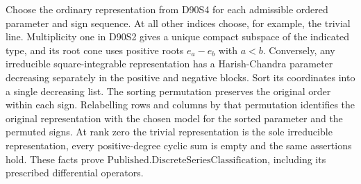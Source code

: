 Choose the ordinary representation from D90S4 for each admissible
ordered parameter and sign sequence. At all other indices choose,
for example, the trivial line. Multiplicity one in D90S2 gives a
unique compact subspace of the indicated type, and its root cone
uses positive roots $e_a-e_b$ with $a<b$. Conversely, any
irreducible square-integrable representation has a Harish-Chandra
parameter decreasing separately in the positive and negative
blocks. Sort its coordinates into a single decreasing list.
The sorting permutation preserves the original order within each
sign. Relabelling rows and columns by that permutation identifies
the original representation with the chosen model for the sorted
parameter and the permuted signs. At rank zero the trivial
representation is the sole irreducible representation, every
positive-degree cyclic sum is empty and the same assertions hold.
These facts prove $\mathrm{Published.DiscreteSeriesClassification}$,
including its prescribed differential operators.
